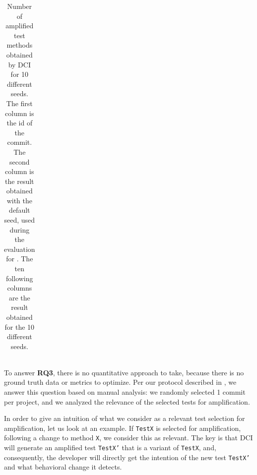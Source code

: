 \begin{table}
\small
\def\arraystretch{.5}%
\setlength\tabcolsep{3pt} %
\caption{Number of amplified test methods obtained by DCI for 10 different seeds. The first column is the id of the commit. The second column is the result obtained with the default seed, used during the evaluation for \rqdetection. The ten following columns are the result obtained for the 10 different seeds.}
\label{tab:overall_result_seeds}
\begin{tabular}{l|c|llllllllll}

\end{tabular}
\end{table}

\begin{mdframed}
\end{mdframed}


\subsubsection{\rqselection}
\label{subsubsec:answerq3}

To answer \textbf{RQ3}, there is no quantitative approach to take, because there is no ground truth data or metrics to optimize. 
Per our protocol described in , we answer this question based on manual analysis:
we randomly selected 1 commit per project, and we analyzed the relevance of the selected tests for amplification.

In order to give an intuition of what we consider as a relevant test selection for amplification, let us look at an example. 
If \texttt{TestX} is selected for amplification, following a change to method \texttt{X}, we consider this as relevant. The key is that DCI will generate an amplified test \texttt{TestX'} that is a variant of \texttt{TestX}, and, consequently, the developer will directly get the intention of the new test \texttt{TestX'} and what behavioral change it detects.

